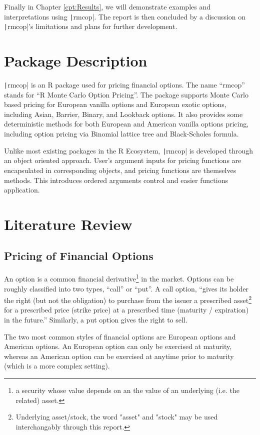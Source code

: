 Finally in Chapter \ref{cpt:Results}, we will demonstrate examples and interpretations using \texttt|rmcop|. The report is then concluded by a discussion on \texttt|rmcop|'s limitations and plans for further development.

\section{Package Description} \label{sec:Pkg Description}

\texttt|rmcop| is an R package used for pricing financial options. The name ``rmcop'' stands for ``R Monte Carlo Option Pricing''. The package supports Monte Carlo based pricing for European vanilla options and European exotic options, including Asian, Barrier, Binary, and Lookback options. It also provides some deterministic methods for both European and American vanilla options pricing, including option pricing via Binomial lattice tree and Black-Scholes formula.

Unlike most existing packages in the R Ecosystem, \texttt|rmcop| is developed through an object oriented approach. User's argument inputs for pricing functions are encapsulated in corresponding objects, and pricing functions are themselves methods. This introduces ordered arguments control and easier functions application.

\section{Literature Review} \label{sec:Literature Review}

\subsection{Pricing of Financial Options}

An option is a common financial derivative\footnote{a security whose value depends on an the value of an underlying (i.e. the related) asset.} in the market. Options can be roughly classified into two types, ``call'' or ``put''. A call option, ``gives its holder the right (but not the obligation) to purchase from the issuer a prescribed asset\footnote{Underlying asset/stock, the word "asset" and "stock" may be used interchangably through this report.} for a prescribed price (strike price) at a prescribed time (maturity / expiration) in the future.\cite{Higham2004}'' Similarly, a put option gives the right to sell.

The two most common styles of financial options are European options and American options. An European option can only be exercised at maturity, whereas an American option can be exercised at anytime prior to maturity (which is a more complex setting).

